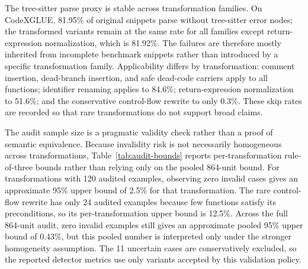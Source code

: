 \documentclass[a4paper,fleqn]{cas-dc}
\begin{document}
The tree-sitter parse proxy is stable across transformation families. On
CodeXGLUE, 81.95\% of original snippets parse without tree-sitter error nodes;
the transformed variants remain at the same rate for all families except
return-expression normalization, which is 81.92\%. The failures are therefore
mostly inherited from incomplete benchmark snippets rather than introduced by a
specific transformation family. Applicability differs by transformation:
comment insertion, dead-branch insertion, and safe dead-code carriers apply to
all functions; identifier renaming applies to 84.6\%; return-expression
normalization to 51.6\%; and the conservative control-flow rewrite to only
0.3\%. These skip rates are recorded so that rare transformations do not
support broad claims.

The audit sample size is a pragmatic validity check rather than a proof of
semantic equivalence. Because invalidity risk is not necessarily homogeneous
across transformations, Table~\ref{tab:audit-bounds} reports
per-transformation rule-of-three bounds rather than relying only on the pooled
864-unit bound. For transformations with 120 audited examples, observing zero
invalid cases gives an approximate 95\% upper bound of 2.5\% for that
transformation. The rare control-flow rewrite has only 24 audited examples
because few functions satisfy its preconditions, so its per-transformation
upper bound is 12.5\%. Across the full 864-unit audit, zero invalid examples
still gives an approximate pooled 95\% upper bound of 0.43\%, but this pooled
number is interpreted only under the stronger homogeneity assumption. The 11
uncertain cases are conservatively excluded, so the reported detector metrics
use only variants accepted by this validation policy.

\begin{table}[t]
  \centering
  \caption{Human-audit invalidity bounds and compile-anchor check.}
  \label{tab:audit-bounds}
\end{table}
\end{document}
